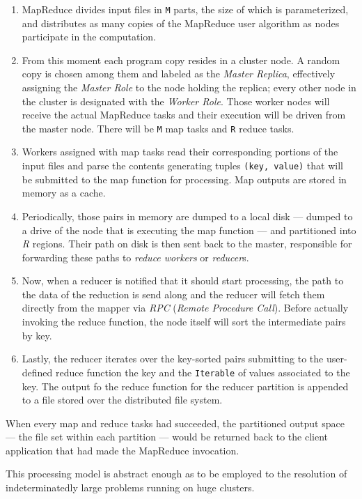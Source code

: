 \begin{enumerate}
 \item MapReduce divides input files in \texttt{M} parts, the size of which is parameterized, and distributes as many copies of the MapReduce user algorithm as nodes participate in the computation.
 \item From this moment each program copy resides in a cluster node. A random copy is chosen among them and labeled as the \emph{Master Replica}, effectively assigning the \emph{Master Role} to the node holding the replica; every other node in the cluster is designated with the \emph{Worker Role}. Those worker nodes will receive the actual MapReduce tasks and their execution will be driven from the master node. There will be \texttt{M} map tasks and \texttt{R} reduce tasks.
 \item Workers assigned with map tasks read their corresponding portions of the input files and parse the contents generating tuples \texttt{(key, value)} that will be submitted to the map function for processing. Map outputs are stored in memory as a cache.
 \item Periodically, those pairs in memory are dumped to a local disk --- dumped to a drive of the node that is executing the map function --- and partitioned into \emph{R} regions. Their path on disk is then sent back to the master, responsible for forwarding these paths to \emph{reduce workers} or \emph{reducer}s.
 \item Now, when a reducer is notified that it should start processing, the path to the data of the reduction is send along and the reducer will fetch them directly from the mapper via \emph{RPC} (\emph{Remote Procedure Call}). Before actually invoking the reduce function, the node itself will sort the intermediate pairs by key.
 \item Lastly, the reducer iterates over the key-sorted pairs submitting to the user-defined reduce function the key and the \texttt{Iterable} of values associated to the key. The output fo the reduce function for the reducer partition is appended to a file stored over the distributed file system.
\end{enumerate}

When every map and reduce tasks had succeeded, the partitioned output space --- the file set within each partition --- would be returned back to the client application that had made the MapReduce invocation.

This processing model is abstract enough as to be employed to the resolution of indeterminatedly large problems running on huge clusters.

